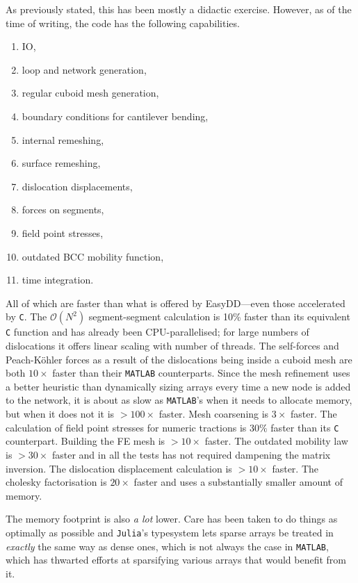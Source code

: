 As previously stated, this has been mostly a didactic exercise. However, as of the time of writing, the code has the following capabilities.
\begin{enumerate}
    \item IO,
    \item loop and network generation,
    \item regular cuboid mesh generation,
    \item boundary conditions for cantilever bending,
    \item internal remeshing,
    \item surface remeshing,
    \item dislocation displacements,
    \item forces on segments,
    \item field point stresses,
    \item outdated BCC mobility function,
    \item time integration.
\end{enumerate}

All of which are faster than what is offered by EasyDD---even those accelerated by \texttt{C}. The $\mathcal{O}(N^2)$ segment-segment calculation is 10\% faster than its equivalent \texttt{C} function and has already been CPU-parallelised; for large numbers of dislocations it offers linear scaling with number of threads. The self-forces and Peach-K\"{o}hler forces as a result of the dislocations being inside a cuboid mesh are both $10\times$ faster than their \texttt{MATLAB} counterparts. Since the mesh refinement uses a better heuristic than dynamically sizing arrays every time a new node is added to the network, it is about as slow as \texttt{MATLAB}'s when it needs to allocate memory, but when it does not it is $>100\times$ faster. Mesh coarsening is $3\times$ faster. The calculation of field point stresses for numeric tractions is $30\%$ faster than its \texttt{C} counterpart. Building the FE mesh is $>10\times$ faster. The outdated mobility law is $>30\times$ faster and in all the tests has not required dampening the matrix inversion. The dislocation displacement calculation is $>10\times$ faster. The cholesky factorisation is $20\times$ faster and uses a substantially smaller amount of memory.

The memory footprint is also \emph{a lot} lower. Care has been taken to do things as optimally as possible and \texttt{Julia}'s typesystem lets sparse arrays be treated in \emph{exactly} the same way as dense ones, which is not always the case in \texttt{MATLAB}, which has thwarted efforts at sparsifying various arrays that would benefit from it.

